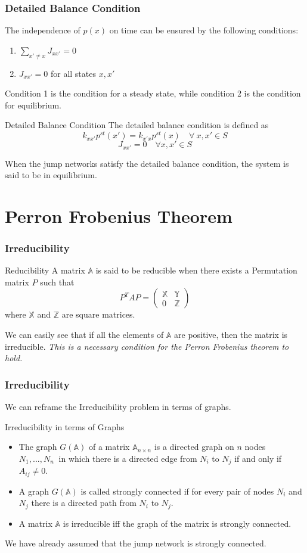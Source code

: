 \documentclass[9pt]{beamer}
\newcommand{\A}{\mathbb{A}}
\newcommand{\X}{\mathbb{X}}
\newcommand{\Y}{\mathbb{Y}}
\newcommand{\Z}{\mathbb{Z}}
\begin{document}
\begin{frame}
  \frametitle{Detailed Balance Condition}
  The independence of $p(x)$ on time can be ensured by the following conditions:
  \begin{enumerate}
    \item $\sum_{x' \neq x} J_{xx'} = 0$
    \item $J_{xx'} = 0$ for all states $x,x'$ 
  \end{enumerate}
  Condition 1 is the condition for a steady state, while condition 2 is the condition for equilibrium.
  \begin{block}{Detailed Balance Condition}
    The detailed balance condition is defined as 
    $$k_{xx'}p^{st}(x') = k_{x'x}p^{st}(x) \quad  \forall ~x,x' \in S$$
    $$ J_{xx'}  =0 \quad \forall x,x' \in S$$
  \end{block}

    When the jump networks satisfy the detailed balance condition, the system is said to be in equilibrium.
\end{frame}

\section{Perron Frobenius Theorem}

\begin{frame}
  \frametitle{Irreducibility}
  \begin{block}{Reducibility}
    A matrix $\A$ is said to be reducible when there exists a Permutation matrix $P$ such that
    $$P^TAP = \begin{pmatrix}
      \X & \Y \\
      0 & \Z
    \end{pmatrix}$$
    where $\X$ and $\Z$ are square matrices. 
  \end{block}
  We can easily see that if all the elements of $\A$ are positive, then the matrix is irreducible.
  \emph{This is a necessary condition for the Perron Frobenius theorem to hold.}

\end{frame}
\begin{frame}
  \frametitle{Irreducibility}
  We can reframe the Irreducibility problem in terms of graphs.

  \begin{block}{Irreducibility in terms of Graphs}
    \begin{itemize}
      \item The graph $G(\A)$ of a matrix $\A_{n \times n}$ is a directed graph on $n$ nodes ${N_1,...,N_n}~$ in which there is a directed edge from $N_i$ to $N_j$ if and only if $A_{ij} \neq 0$.
      \item A graph $G(\A)$ is called strongly connected if for every pair of nodes $N_i$ and $N_j$ there is a directed path from $N_i$ to $N_j$.
      \item A matrix $\A$ is irreducible iff the graph of the matrix is strongly connected.
      \end{itemize}
    \end{block}
    We have already assumed that the jump network is strongly connected.
\end{frame}
\end{document}

